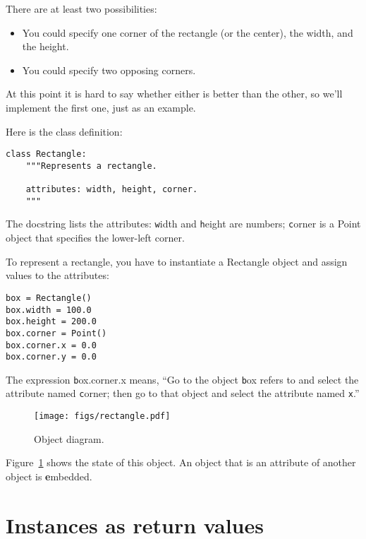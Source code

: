 \documentclass[
DIV=11,
fontsize=12,
twoside,
headinclude=false,
titlepage=firstiscover,
abstract=true,
headsepline=true,
footsepline=true,
chapterprefix=true, %
headings=big,
bibliography=totoc,%
captions=tableheading
]{scrbook}
\theoremstyle{definition}
\begin{document}
There are at least two possibilities: 

\begin{itemize}

\item You could specify one corner of the rectangle
(or the center), the width, and the height.

\item You could specify two opposing corners.

\end{itemize}

At this point it is hard to say whether either is better than
the other, so we'll implement the first one, just as an example.

Here is the class definition:

\begin{lstlisting}
class Rectangle:
    """Represents a rectangle. 

    attributes: width, height, corner.
    """
\end{lstlisting}
%
The docstring lists the attributes:  {\texttt width} and
{\texttt height} are numbers; {\texttt corner} is a Point object that
specifies the lower-left corner.

To represent a rectangle, you have to instantiate a Rectangle
object and assign values to the attributes:

\begin{lstlisting}
box = Rectangle()
box.width = 100.0
box.height = 200.0
box.corner = Point()
box.corner.x = 0.0
box.corner.y = 0.0
\end{lstlisting}
%
The expression {\texttt box.corner.x} means,
``Go to the object {\texttt box} refers to and select the attribute named
{\texttt corner}; then go to that object and select the attribute named
{\texttt x}.''

\begin{figure}
\centerline
{\texttt{[image: figs/rectangle.pdf]}}
\caption{Object diagram.}
\label{fig.rectangle}
\end{figure}


Figure~\ref{fig.rectangle} shows the state of this object.
An object that is an attribute of another object is {\textbf embedded}.


\section{Instances as return values}
\end{document}
